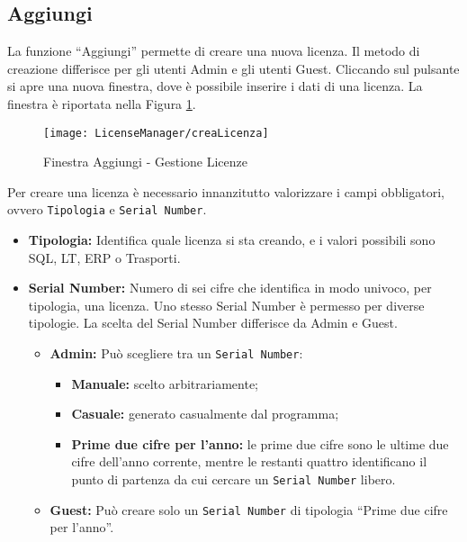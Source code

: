 \subsection{Aggiungi}
La funzione “Aggiungi” permette di creare una nuova licenza. Il metodo di creazione differisce per gli utenti Admin e gli utenti Guest. Cliccando sul pulsante si apre una nuova finestra, dove è possibile inserire i dati di una licenza. La finestra è riportata nella Figura \ref{crealic}.

\begin{figure}[!h] 
    \centering 
    \texttt{[image: LicenseManager/creaLicenza]} 
    \caption{Finestra Aggiungi - Gestione Licenze}
    \label{crealic}
\end{figure}

Per creare una licenza è necessario innanzitutto valorizzare i campi obbligatori, ovvero \texttt{Tipologia} e \texttt{Serial Number}. 
\begin{itemize}

\item \textbf{Tipologia:} Identifica quale licenza si sta creando, e i valori possibili sono SQL, LT, ERP o Trasporti. 
\item \textbf{Serial Number:} Numero di sei cifre che identifica in modo univoco, per tipologia, una licenza. Uno stesso Serial Number è permesso per diverse tipologie. La scelta del Serial Number differisce da Admin e Guest.  
\begin{itemize}

\item	\textbf{Admin:} Può scegliere tra un \texttt{Serial Number}:
\begin{itemize}
\item \textbf{Manuale:} scelto arbitrariamente;
\item \textbf{Casuale:} generato casualmente dal programma;
\item \textbf{Prime due cifre per l'anno:} le prime due cifre sono le ultime due cifre dell'anno corrente, mentre le restanti quattro identificano il punto di partenza da cui cercare un \texttt{Serial Number} libero.
\end{itemize}
\item	\textbf{Guest:} Può creare solo un \texttt{Serial Number} di tipologia “Prime due cifre per l’anno”.
\end{itemize}

\end{itemize}	

